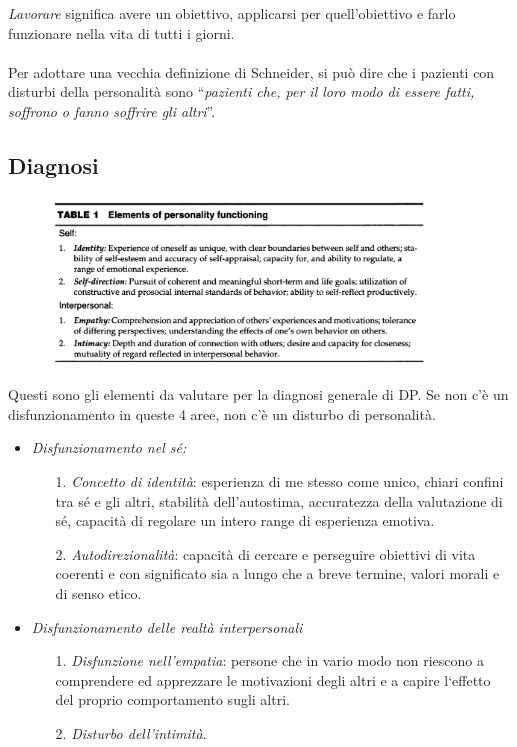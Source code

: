 \emph{Lavorare} significa avere un obiettivo, applicarsi per
quell'obiettivo e farlo funzionare nella vita di tutti i giorni.
\\\\
Per adottare una vecchia definizione di Schneider, si può dire che i
pazienti con disturbi della personalità sono ``\emph{pazienti che, per
il loro modo di essere fatti, soffrono o fanno soffrire gli altri}''.

\subsection{Diagnosi}

\begin{figure}[!ht]
\centering
	\includegraphics[width=0.9\textwidth]{011/image3.png}
\end{figure}

Questi
sono gli elementi da valutare per la diagnosi generale di DP. Se non c'è
un disfunzionamento in queste 4 aree, non c'è un disturbo di
personalità.

\begin{itemize}
\item
  \emph{Disfunzionamento nel sé:}
\begin{itemize}
\item[1.]
  \emph{Concetto di identità}: esperienza di me stesso come unico,
  chiari confini tra sé e gli altri, stabilità dell'autostima,
  accuratezza della valutazione di sé, capacità di regolare un intero
  range di esperienza emotiva.
\item[2.]
  \emph{Autodirezionalità}: capacità di cercare e perseguire obiettivi
  di vita coerenti e con significato sia a lungo che a breve termine,
  valori morali e di senso etico.
\end{itemize}
\item
  \emph{Disfunzionamento delle realtà interpersonali}
\begin{itemize}
\item[1.]
  \emph{Disfunzione nell'empatia}: persone che in vario modo non
  riescono a comprendere ed apprezzare le motivazioni degli altri e a
  capire l`effetto del proprio comportamento sugli altri.
\item[2.]
  \emph{Disturbo dell'intimità.}
\end{itemize}
\end{itemize}

